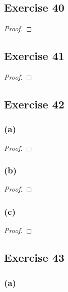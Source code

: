 \documentclass[14pt]{extarticle}
\begin{document}
\subsection{Exercise 40}

\begin{proof}

\end{proof}

\subsection{Exercise 41}

\begin{proof}

\end{proof}

\subsection{Exercise 42}

\subsubsection{(a)}

\begin{proof}

\end{proof}

\subsubsection{(b)}

\begin{proof}

\end{proof}

\subsubsection{(c)}

\begin{proof}

\end{proof}

\subsection{Exercise 43}

\subsubsection{(a)}
\end{document}
